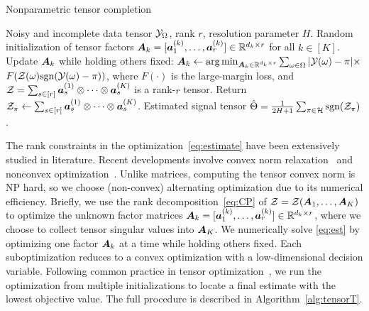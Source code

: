 \documentclass[11pt]{article}
\theoremstyle{plain}
\theoremstyle{definition}
\def\sign{\textup{sgn}}
\begin{document}
\begin{algorithm}[h!]
  \caption{Nonparametric tensor completion}\label{alg:tensorT}
 \begin{algorithmic}[1] 
\INPUT  Noisy and incomplete data tensor $\mathcal{Y}_\Omega$, rank $r$, resolution parameter $H$.
\State Random initialization of tensor factors $\bm A_k=[\bm{a}^{(k)}_1,\ldots,\bm{a}^{(k)}_r]\in\mathbb{R}^{d_k\times r}$ for all $k\in[K]$. 
\State Update $\bm A_k$ while holding others fixed: $\bm A_k\leftarrow \operatorname*{arg\,min}_{\bm A_k\in\mathbb{R}^{d_k\times r}}\sum_{\omega\in \Omega} |\mathcal{Y}(\omega)-\pi|\times$ $F(\tZ(\omega)\sign(\tY(\omega)-\pi))$, where $F(\cdot)$ is the large-margin loss, and $\mathcal{Z}=\sum_{s\in[r]} \bm{a}^{(1)}_s\otimes \cdots\otimes \bm{a}^{(K)}_s$ is a rank-$r$ tensor. 
\EndFor
\EndWhile
\State Return $\mathcal{Z}_\pi\leftarrow \sum_{s\in[r]} \bm{a}^{(1)}_s\otimes \cdots\otimes \bm{a}^{(K)}_s$.
\EndFor
\OUTPUT Estimated signal tensor $\hat \Theta={1\over 2H+1}\sum_{\pi \in \tH}\sign(\tZ_\pi)$.
    \end{algorithmic}
\end{algorithm}

The rank constraints in the optimization~\eqref{eq:estimate} have been extensively studied in literature. Recent developments involve convex norm relaxation~\citep{ghadermarzy2018learning} and nonconvex optimization~\citep{wang2018learning, han2020optimal}. Unlike matrices, computing the tensor convex norm is NP hard, so we choose (non-convex) alternating optimization due to its numerical efficiency. Briefly, we use the rank decomposition~\eqref{eq:CP} of $\mathcal{Z}=\mathcal{Z}(\bm A_1,\ldots, \bm A_K)$ to optimize the unknown factor matrices $\bm A_k=[\bm{a}^{(k)}_1,\ldots,\bm{a}^{(k)}_r]\in\mathbb{R}^{d_k\times r}$, where we choose to collect tensor singular values into $\bm A_K$. We numerically solve \eqref{eq:est} by optimizing one factor $\bm A_k$ at a time while holding others fixed. Each suboptimization reduces to a convex optimization with a low-dimensional decision variable. Following common practice in tensor optimization~\citep{anandkumar2014tensor,hong2020generalized}, we run the optimization from multiple initializations to locate a final estimate with the lowest objective value. The full procedure is described in Algorithm~\ref{alg:tensorT}.
\end{document}
